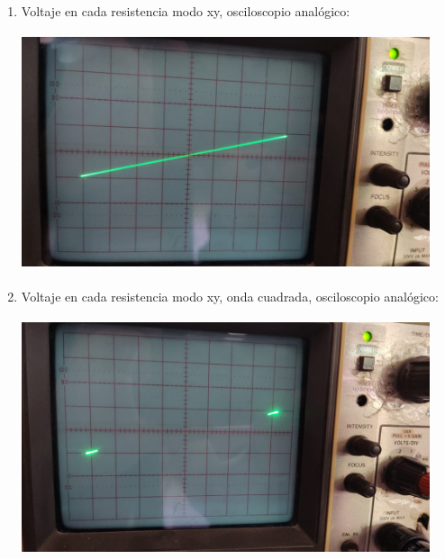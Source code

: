 \documentclass[12pt]{article}
\begin{document}
\begin{enumerate}
		\item Voltaje en cada resistencia modo xy, osciloscopio analógico:
		
		\includegraphics[width=12cm,height=7cm]{Img/lab_5_img_4}
		
		\item Voltaje en cada resistencia modo xy, onda cuadrada, osciloscopio analógico:
		 
		\includegraphics[width=12cm,height=7cm]{Img/lab_5_img_5}
		
	\end{enumerate}

	\newpage
	
\end{document}

